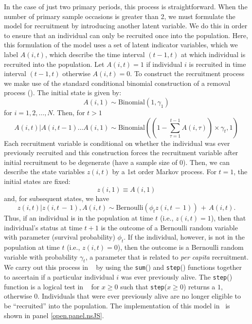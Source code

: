 In the case of just two primary periods, this process is
straightforward.  When the number of primary sample occasions is
greater than 2, we must formulate the model for recruitment by
introducing another latent variable.  We do this in order to ensure
that an individual can only be recruited once into the population.
Here, this formulation of the model uses a set of latent indicator
variables, which we label $A(i,t)$,
which describe the time interval $(t-1, t)$ at
which individual is recruited into the population.  Let $A(i,t) = 1$
if individual $i$ is recruited in time interval $(t-1, t)$ otherwise
$A(i,t)=0$.  To construct the recruitment process we make use of the
standard conditional binomial construction of a removal process
(\citealt{royle_dorazio:2008}).  The initial state is given by:
\[
   A(i,1) \sim \mbox{Binomial}(1, \gamma_{1})
\]
for $i=1,2,\ldots,N$. Then, for $t>1$
\[
 A(i,t)|A(i, t-1) \dots A(i, 1) \sim \mbox{Binomial}((1 - \sum_{\tau=1}^{t-1} A(i, \tau) ) \times \gamma_{t}, 1)
\]
Each recruitment variable is conditional on whether the individual was ever
previously recruited and this construction forces the recruitment
variable after initial recruitment to be degenerate (have a sample
size of 0).  Then, we can describe the state variables $z(i,t)$ by a
1st order Markov process.  For $t=1$, the initial states are fixed:
\[
z(i,1) \equiv A(i,1)
\]
and,
 for subsequent states, we have
\[
z(i,t)|z(i,t\,-\,1),A(i,t)
 \sim \mbox{Bernoulli} (\phi_{t} z(i,t\,-\,1)) \,+ \,  A(i,t).
\]
Thus, if an individual is in the population at time $t$ (i.e., $z(i,t)
= 1$), then that individual's status at time $t+1$ is the outcome of a
Bernoulli random variable with parameter (survival probability)
$\phi_{t}$.  If the individual, however, is not in the population at
time $t$ (i.e., $z(i,t) = 0$), then the outcome is a Bernoulli random
variable with probability $\gamma_{t}$, a parameter that is related to
{\it per capita} recruitment.  We carry out this process in \jags~ by
using the \mbox{\tt sum}() and \mbox{\tt step}() functions together to
ascertain if a particular individual $i$ was ever previously alive.
The \mbox{\tt step}() function is a logical test in \jags~ for $x \geq 0$
such that \mbox{\tt step}($x \geq 0$) returns a $1$, otherwise $0$.
Individuals that were ever previously alive are no longer eligible to
be ``recruited'' into the population.  The implementation of this model
in \jags~is shown in panel \ref{open.panel.nsJS}.


